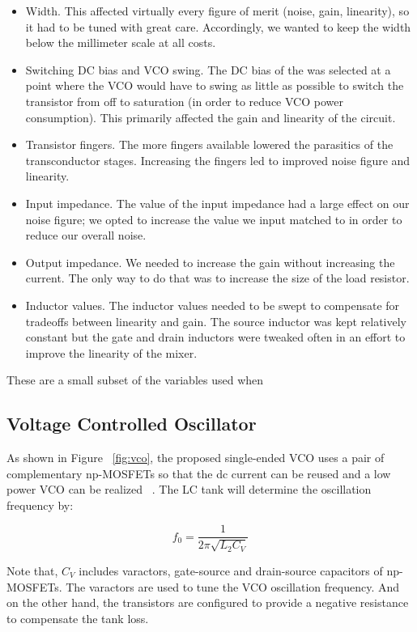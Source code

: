 \begin{itemize}
	\item Width. This affected virtually every figure of merit (noise, gain, linearity), so it had to be tuned with great care. Accordingly, we wanted to keep the width below the millimeter scale at all costs.
	\item Switching DC bias and VCO swing. The DC bias of the was selected at a point where the VCO would have to swing as little as possible to switch the transistor from off to saturation (in order to reduce VCO power consumption). This primarily affected the gain and linearity of the circuit.
	\item Transistor fingers. The more fingers available lowered the parasitics of the transconductor stages. Increasing the fingers led to improved noise figure and linearity.
	\item Input impedance. The value of the input impedance had a large effect on our noise figure; we opted to increase the value we input matched to in order to reduce our overall noise.
	\item Output impedance. We needed to increase the gain without increasing the current. The only way to do that was to increase the size of the load resistor.
	\item Inductor values. The inductor values needed to be swept to compensate for tradeoffs between linearity and gain. The source inductor was kept relatively constant but the gate and drain inductors were tweaked often in an effort to improve the linearity of the mixer.
\end{itemize}

These are a small subset of the variables used when 

\subsection{Voltage Controlled Oscillator}
As shown in Figure ~\ref{fig:vco}, the proposed single-ended VCO uses a pair of complementary np-MOSFETs so that the dc current can be reused and a low power VCO can be realized ~\cite{vco}. The LC tank will determine the oscillation frequency by:

\begin{equation}
f_0 = \frac{1}{2\pi\sqrt{L_2C_V}}
\end{equation}

Note that, $C_V$ includes varactors, gate-source and drain-source capacitors of np-MOSFETs. The varactors are used to tune the VCO oscillation frequency. And on the other hand, the transistors are configured to provide a negative resistance to compensate the tank loss. 

